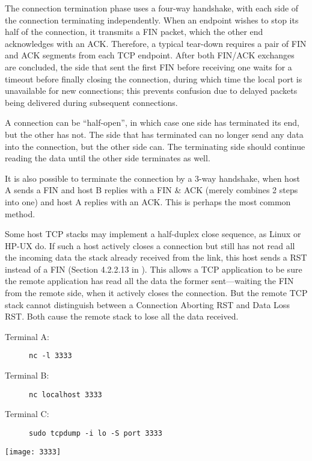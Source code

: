 The connection termination phase uses a four-way handshake, with each side of the
connection terminating independently. When an endpoint wishes to stop its half of the
connection, it transmits a FIN packet, which the other end acknowledges with an
ACK. Therefore, a typical tear-down requires a pair of FIN and ACK segments from each TCP
endpoint. After both FIN/ACK exchanges are concluded, the side that sent the first FIN
before receiving one waits for a timeout before finally closing the connection, during
which time the local port is unavailable for new connections; this prevents confusion due
to delayed packets being delivered during subsequent connections. 

A connection can be ``half-open'', in which case one side has terminated its end, but the
other has not. The side that has terminated can no longer send any data into the
connection, but the other side can. The terminating side should continue reading the data
until the other side terminates as well.

It is also possible to terminate the connection by a 3-way handshake, when host A sends a
FIN and host B replies with a FIN \& ACK (merely combines 2 steps into one) and host A
replies with an ACK. This is perhaps the most common method.

Some host TCP stacks may implement a half-duplex close sequence, as Linux or HP-UX do. If
such a host actively closes a connection but still has not read all the incoming data the
stack already received from the link, this host sends a RST instead of a FIN (Section
4.2.2.13 in ). This allows a TCP application to be sure the
remote application has read all the data the former sent—waiting the FIN from the remote
side, when it actively closes the connection. But the remote TCP stack cannot distinguish
between a Connection Aborting RST and Data Loss RST. Both cause the remote stack to lose
all the data received.

\begin{frame}%
  \begin{minipage}{.78\linewidth}
    \begin{description}
    \item[Terminal A:] \texttt{nc -l 3333}
    \item[Terminal B:] \texttt{nc localhost 3333}
    \item[Terminal C:] \texttt{sudo tcpdump -i lo -S port 3333}
    \end{description}
  \end{minipage}\hfill
  \begin{minipage}{.2\linewidth}
    \texttt{[image: 3333]}
  \end{minipage}
  \begin{center}
  \end{center}
\end{frame}

